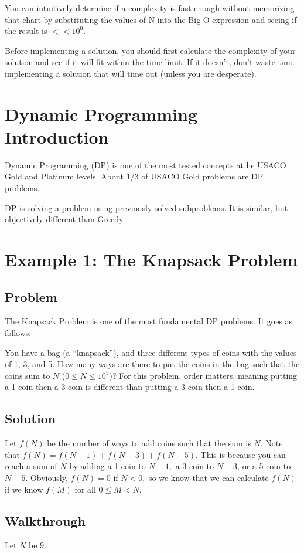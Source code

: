 \documentclass{article}
\begin{document}
You can intuitively determine if a complexity is fast enough without memorizing that chart by substituting the values of N into the Big-O expression and seeing if the result is $<<10^9.$ 

Before implementing a solution, you should first calculate the complexity of your solution and see if it will fit within the time limit. If it doesn't, don't waste time implementing a solution that will time out (unless you are desperate). 


\section{Dynamic Programming Introduction}
Dynamic Programming (DP) is one of the most tested concepts at he USACO Gold and Platinum levels. About 1/3 of USACO Gold problems are DP problems. 

DP is solving a problem using previously solved subproblems. It is similar, but objectively different than Greedy.

\section{Example 1: The Knapsack Problem}
\subsection{Problem}
The Knapsack Problem is one of the most fundamental DP problems. It goes as follows:

You have a bag (a ``knapsack''), and three different types of coins with the values of 1, 3, and 5. How many ways are there to put the coins in the bag such that the coins sum to $N$ ($0 \leq N \leq 10^5)?$ For this problem, order matters, meaning putting a 1 coin then a 3 coin is different than putting a 3 coin then a 1 coin.

\subsection{Solution}
Let $f(N)$ be the number of ways to add coins such that the sum is $N.$ Note that $f(N) = f(N-1) + f(N-3) + f(N-5).$ This is because you can reach a sum of $N$ by adding a 1 coin to $N-1,$ a 3 coin to $N-3$, or a 5 coin to $N-5.$ Obviously, $f(N) = 0$ if $N < 0,$ so we know that we can calculate $f(N)$ if we know $f(M)$ for all $0 \leq M < N.$ 

\subsection{Walkthrough}
Let $N$ be $9.$
\end{document}
